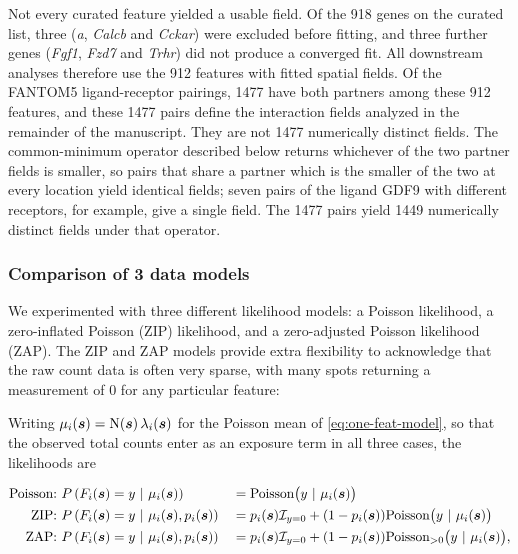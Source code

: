 \documentclass[10pt,letterpaper]{article}
\begin{document}
Not every curated feature yielded a usable field. Of the 918 genes on the curated list, three (\textit{a}, \textit{Calcb} and \textit{Cckar}) were excluded before fitting, and three further genes (\textit{Fgf1}, \textit{Fzd7} and \textit{Trhr}) did not produce a converged fit. All downstream analyses therefore use the 912 features with fitted spatial fields. Of the FANTOM5 ligand-receptor pairings, 1477 have both partners among these 912 features, and these 1477 pairs define the interaction fields analyzed in the remainder of the manuscript. They are not 1477 numerically distinct fields. The common-minimum operator described below returns whichever of the two partner fields is smaller, so pairs that share a partner which is the smaller of the two at every location yield identical fields; seven pairs of the ligand GDF9 with different receptors, for example, give a single field. The 1477 pairs yield 1449 numerically distinct fields under that operator.

\subsubsection*{Comparison of 3 data models}\label{sec:meth-model-comp}

We experimented with three different likelihood models: a Poisson likelihood, a zero-inflated Poisson (ZIP) likelihood, and a zero-adjusted Poisson likelihood (ZAP). The ZIP and ZAP models provide extra flexibility to acknowledge that the raw count data is often very sparse, with many spots returning a measurement of 0 for any particular feature:

Writing $\mu_i(\mbox{\boldmath $s$}) = \mbox{N}(\mbox{\boldmath $s$})\,\lambda_i(\mbox{\boldmath $s$})$ for the Poisson mean of \eqref{eq:one-feat-model}, so that the observed total counts enter as an exposure term in all three cases, the likelihoods are

\begin{equation}\label{eq:three-lik}
\begin{aligned}
    \mbox{Poisson:}\  &P\left(F_i(\mbox{\boldmath $s$})=y\ |\ \mu_i(\mbox{\boldmath $s$})\right) &&= \mbox{Poisson}\big(y\ |\ \mu_i(\mbox{\boldmath $s$})\big)\\
    \mbox{ZIP:}\  &P\left(F_i(\mbox{\boldmath $s$}) = y\ |\ \mu_i(\mbox{\boldmath $s$}), p_i(\mbox{\boldmath $s$})\right) &&= p_i(\mbox{\boldmath $s$})\mathcal{I}_{y=0}  + (1-p_i(\mbox{\boldmath $s$}))\mbox{Poisson}\big(y\ |\  \mu_i(\mbox{\boldmath $s$})\big) \\
    \mbox{ZAP:}\  &P\left(F_i(\mbox{\boldmath $s$})= y\ |\ \mu_i(\mbox{\boldmath $s$}), p_i(\mbox{\boldmath $s$})\right) &&= p_i(\mbox{\boldmath $s$})\mathcal{I}_{y=0}  + (1-p_i(\mbox{\boldmath $s$})) \mbox{Poisson}_{>0}\big(y\ |\  \mu_i(\mbox{\boldmath $s$})\big),
\end{aligned}
\end{equation}
\end{document}
